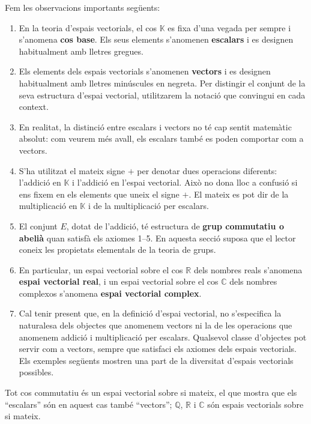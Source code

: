 \begin{observacio}
Fem les observacions importants següents:

\begin{enumerate}
\item En la teoria d’espais vectorials, el cos $\mathbb{K}$ es fixa d’una vegada per sempre i s’anomena \textbf{cos base}. Els seus elements s’anomenen \textbf{escalars} i es designen habitualment amb lletres gregues.
\item Els elements dels espais vectorials s’anomenen \textbf{vectors} i es designen habitualment amb lletres minúscules en negreta. Per distingir el conjunt de la seva estructura d’espai vectorial, utilitzarem la notació que convingui en cada context.
\item En realitat, la distinció entre escalars i vectors no té cap sentit matemàtic absolut: com veurem més avall, els escalars també es poden comportar com a vectors.
\item S’ha utilitzat el mateix signe $+$ per denotar dues operacions diferents: l’addició en $\mathbb{K}$ i l’addició en l’espai vectorial. Això no dona lloc a confusió si ens fixem en els elements que uneix el signe $+$. El mateix es pot dir de la multiplicació en $\mathbb{K}$ i de la multiplicació per escalars.
\item El conjunt $E$, dotat de l’addició, té estructura de \textbf{grup commutatiu o abelià} quan satisfà els axiomes 1--5. En aquesta secció suposa que el lector coneix les propietats elementals de la teoria de grups.
\item En particular, un espai vectorial sobre el cos $\mathbb{R}$ dels nombres reals s’anomena \textbf{espai vectorial real}, i un espai vectorial sobre el cos $\mathbb{C}$ dels nombres complexos s’anomena \textbf{espai vectorial complex}.
\item Cal tenir present que, en la definició d’espai vectorial, no s’especifica la naturalesa dels objectes que anomenem vectors ni la de les operacions que anomenem addició i multiplicació per escalars. Qualsevol classe d’objectes pot servir com a vectors, sempre que satisfaci els axiomes dels espais vectorials. Els exemples següents mostren una part de la diversitat d’espais vectorials possibles.
\end{enumerate}
\end{observacio}

\begin{exemple}
Tot cos commutatiu és un espai vectorial sobre si mateix, el que
mostra que els ``escalars'' són en aquest cas també ``vectors''; $%
\mathbb{Q}$, $\mathbb{R}$ i $\mathbb{C}$ són espais vectorials sobre si mateix.
\end{exemple}


